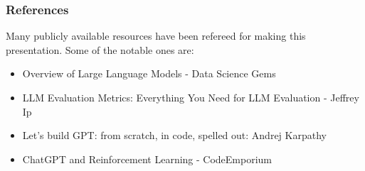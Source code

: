 \begin{frame}\frametitle{References}
Many publicly available resources have been refereed for making this presentation. Some of the notable ones are:
\footnotesize
\begin{itemize}
\item Overview of Large Language Models - Data Science Gems
\item LLM Evaluation Metrics: Everything You Need for LLM Evaluation - Jeffrey Ip
\item Let's build GPT: from scratch, in code, spelled out: Andrej Karpathy
\item ChatGPT and Reinforcement Learning - CodeEmporium
\end{itemize}
\end{frame}


